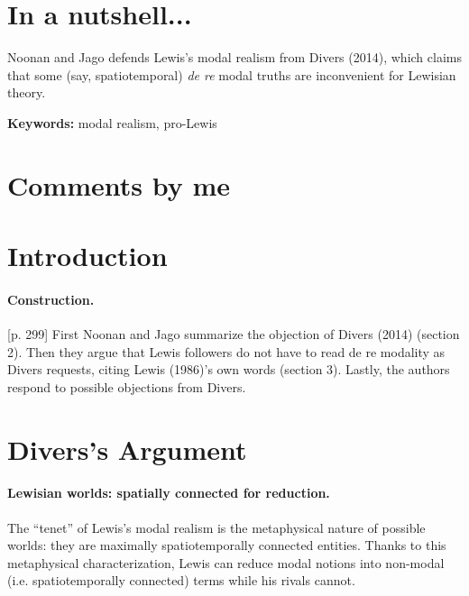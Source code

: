 \documentclass[
10pt, %
a4paper, %
twocolumn, %
landscape %
]{article}
\begin{document}
\pagestyle{myheadings} %
\markright{\doctitle} %


\thispagestyle{plain} %

\printtitle %


\section*{In a nutshell... }
Noonan and Jago defends Lewis's modal realism from Divers (2014), which claims that some (say, spatiotemporal) \textit{de re} modal truths are inconvenient for Lewisian theory.


\noindent \textbf{Keywords:} modal realism, pro-Lewis

\section*{Comments by me}

\section{Introduction}
\paragraph{Construction.}
[p. 299]
First Noonan and Jago summarize the objection of Divers (2014) (section 2). Then they argue that Lewis followers do not have to read de re modality as Divers requests, citing Lewis (1986)'s own words (section 3). Lastly, the authors respond to possible objections from Divers.

\section{Divers's Argument}
\paragraph{Lewisian worlds: spatially connected for reduction. }
The ``tenet'' of Lewis's modal realism is the metaphysical nature of possible worlds: they are maximally spatiotemporally connected entities. Thanks to this metaphysical characterization, Lewis can reduce modal notions into non-modal (i.e. spatiotemporally connected) terms while his rivals cannot.
\end{document}
